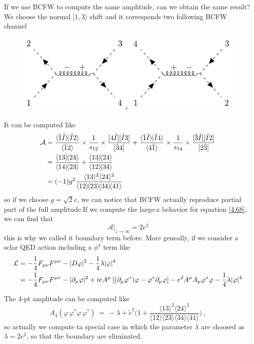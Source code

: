 \documentclass[12pt]{article}
\numberwithin{equation}{section}
\newcommand{\mdavg}[2]{\langle #1 \rangle\!\langle #2 \rangle}
\newcommand{\avg}[1]{\langle #1 \rangle}
\begin{document}
If we use BCFW to compute the same amplitude, can we obtain the same result? We choose the normal $[1,3\rangle$ shift and it corresponds two following BCFW channel
\begin{figure}[H]
    \centering
    \includegraphics{s4pt1.pdf}
\end{figure}
It can be computed like
\begin{align}
    \mathcal{A}&=\frac{\mdavg{\hat{1}\hat{I}}{\hat{I}2}}{\avg{\hat{1}2}}\times\frac{1}{s_{12}}\times\frac{[4\hat{I}][\hat{I}3]}{[\hat{3}4]}+\frac{\mdavg{\hat{1}\hat{I}}{\hat{I}4}}{\avg{4\hat{1}}}\times\frac{1}{s_{14}}\times\frac{[\hat{3}\hat{I}][\hat{I}2]}{[2\hat{3}]}\notag\\
    &=\frac{\mdavg{13}{24}}{\mdavg{14}{23}}+\frac{\mdavg{13}{24}}{\mdavg{12}{34}}\notag\\
    &=(-1)g^2\frac{\avg{13}^2\avg{24}^2}{\mdavg{12}{23}\!\mdavg{34}{41}}
\end{align}
so if we choose $g=\sqrt{2}e$, we can notice that BCFW actually reproduce partial part of the full amplitude.If we compute the large-z behavior for equation \eqref{4.68}, we can find that
\begin{equation}
    \mathcal{A}|_{z\rightarrow \infty}=2e^2
\end{equation}
this is why we called it boundary term before. More geneally, if we consider a sclar QED action including a $\phi^4$
term like
\begin{align}
  \mathcal{L} 
  &= - \frac{1}{4} F_{\mu\nu}F^{\mu\nu} - |D\varphi|^2 - \frac{1}{4} \lambda |\varphi|^4 \notag\\
  &= - \frac{1}{4} F_{\mu\nu}F^{\mu\nu} - |\partial_\mu \varphi|^2
     + i e A^\mu \left[ (\partial_\mu \varphi^*) \varphi - \varphi^* \partial_\mu \varphi \right]- e^2 A^\mu A_\mu \varphi^* \varphi - \frac{1}{4} \lambda |\varphi|^4
\end{align}

The 4-pt amplitude can be computed like
\begin{equation}
    A_4(\varphi\, \varphi^* \varphi\, \varphi^*)
  ~=~
  -\lambda + \tilde{e}^2 
  \bigg( 
     1+\frac{\avg{13}^2\avg{24}^2}{\mdavg{12}{23}\!\mdavg{34}{41}}
  \bigg) \,,
\end{equation}
so actually we compute ta special case in which the parameter $\lambda$ are choosed as $\lambda=2e^2$, so that the boundary are eliminated. 
\end{document}
